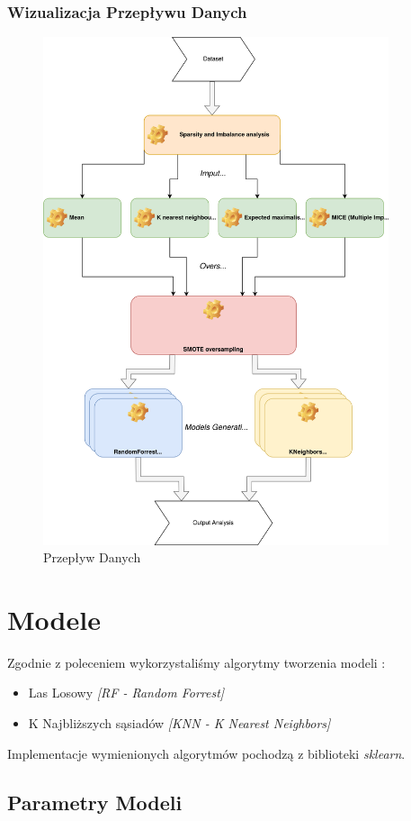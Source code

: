 \documentclass[11pt]{article}
\begin{document}
\subsubsection{Wizualizacja Przepływu Danych}
\begin{figure}[h]
	\caption{Przepływ Danych}
	\begin{center}
		\includegraphics[width=4in]{Dataflow}
	\end{center}
\end{figure}
\section{Modele}
Zgodnie z poleceniem wykorzystaliśmy algorytmy tworzenia modeli : 
\begin{itemize}
	\item Las Losowy \textit{[RF - Random Forrest]}
	\item K Najbliższych sąsiadów \textit{[KNN - K Nearest Neighbors]}
\end{itemize}
Implementacje wymienionych algorytmów pochodzą z biblioteki \textit{sklearn}.
\subsection{Parametry Modeli}
\end{document}
